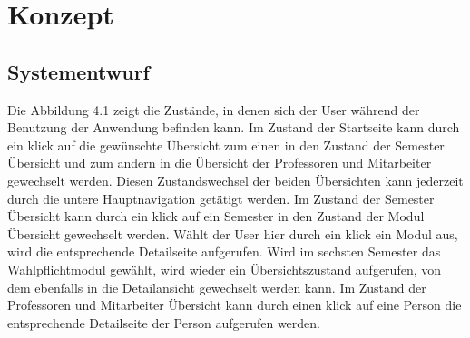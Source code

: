 \documentclass[12pt,					%
							 oneside,			%
							 a4paper,			%
							 halfparskip,		%
							 liststotoc,			%
							 bibtotoc,			%
							 fleqn,				%
							 pointlessnumbers]	%
							 {scrreprt}
\begin{document}
\chapter{Konzept}			
		
		\section{Systementwurf}
		Die Abbildung 4.1 zeigt die Zustände, in denen sich der User während der Benutzung der Anwendung befinden kann. Im Zustand der Startseite kann durch ein klick auf die gewünschte Übersicht zum einen in den Zustand der Semester Übersicht und zum andern in die Übersicht der Professoren und Mitarbeiter gewechselt werden. Diesen Zustandswechsel der beiden Übersichten kann jederzeit durch die untere Hauptnavigation getätigt werden. Im Zustand der Semester Übersicht kann durch ein klick auf ein Semester in den Zustand der Modul Übersicht gewechselt werden. Wählt der User hier durch ein klick ein Modul aus, wird die entsprechende Detailseite aufgerufen. Wird im sechsten Semester das Wahlpflichtmodul gewählt, wird wieder ein Übersichtszustand aufgerufen, von dem ebenfalls in die Detailansicht gewechselt werden kann. Im Zustand der Professoren und Mitarbeiter Übersicht kann durch einen klick auf eine Person die entsprechende Detailseite der Person aufgerufen werden.
				
\end{document}

